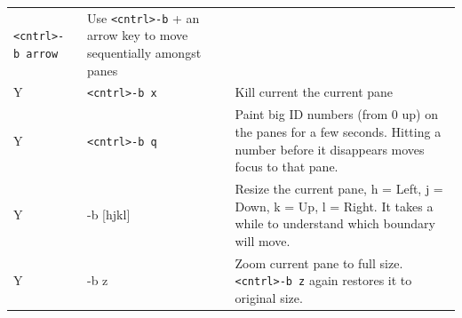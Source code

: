 \documentclass[]{krantz}
\begin{document}
\begin{longtable}[]{@{}lll@{}}
\begin{minipage}[t]{0.25\columnwidth}
\texttt{\textless{}cntrl\textgreater{}-b\ arrow}\strut
\end{minipage} & \begin{minipage}[t]{0.42\columnwidth}\raggedright
Use \texttt{\textless{}cntrl\textgreater{}-b} + an arrow key
to move sequentially amongst
panes\strut
\end{minipage}\tabularnewline
\begin{minipage}[t]{0.19\columnwidth}\raggedright
Y\strut
\end{minipage} & \begin{minipage}[t]{0.25\columnwidth}\raggedright
\texttt{\textless{}cntrl\textgreater{}-b\ x}\strut
\end{minipage} & \begin{minipage}[t]{0.42\columnwidth}\raggedright
Kill current the current pane\strut
\end{minipage}\tabularnewline
\begin{minipage}[t]{0.19\columnwidth}\raggedright
Y\strut
\end{minipage} & \begin{minipage}[t]{0.25\columnwidth}\raggedright
\texttt{\textless{}cntrl\textgreater{}-b\ q}\strut
\end{minipage} & \begin{minipage}[t]{0.42\columnwidth}\raggedright
Paint big ID numbers (from 0
up) on the panes for a few
seconds. Hitting a number
before it disappears moves
focus to that pane.\strut
\end{minipage}\tabularnewline
\begin{minipage}[t]{0.19\columnwidth}\raggedright
Y\strut
\end{minipage} & \begin{minipage}[t]{0.25\columnwidth}\raggedright
-b {[}hjkl{]}\strut
\end{minipage} & \begin{minipage}[t]{0.42\columnwidth}\raggedright
Resize the current pane, h =
Left, j = Down, k = Up, l =
Right. It takes a while to
understand which boundary will
move.\strut
\end{minipage}\tabularnewline
\begin{minipage}[t]{0.19\columnwidth}\raggedright
Y\strut
\end{minipage} & \begin{minipage}[t]{0.25\columnwidth}\raggedright
-b z\strut
\end{minipage} & \begin{minipage}[t]{0.42\columnwidth}\raggedright
Zoom current pane to full
size. \texttt{\textless{}cntrl\textgreater{}-b\ z} again
restores it to original size.\strut
\end{minipage}\tabularnewline
\bottomrule
\end{longtable}
\end{document}
